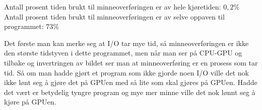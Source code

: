 \documentclass[12pt, a4paper]{article} %
\begin{document}
Antall prosent tiden brukt til minneoverføringen er av hele kjøretiden: $0,2\%$ \\
Antall prosent tiden brukt til minneoverføringen er av selve oppaven til programmet: $73\%$

Det første man kan merke seg at I/O tar mye tid, så minneoverføringen er ikke den største tidstyven i dette programmet, men når man ser på CPU-GPU og tilbake og invertringen av bildet ser man at minneoverføring er en prosess som tar tid. Så om man hadde gjørt et program som ikke gjorde noen I/O ville det nok ikke lønt seg å gjøre det på GPUen med så lite som skal gjøres på GPUen. Hadde det vært er betydelig tyngre program og mye mer minne ville det nok lønnt seg å kjøre på GPUen. 
\end{document}
